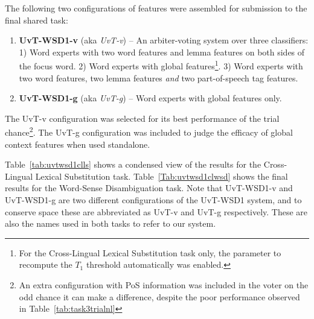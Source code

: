 
The following two configurations of features were assembled for submission to
the final shared task:

\begin{enumerate}
\item \textbf{UvT-WSD1-v} (aka \emph{UvT-v}) -- An arbiter-voting system over
three classifiers: 1) Word experts with two word features and lemma features on
both sides of the focus word. 2) Word experts with global features\footnote{For
the Cross-Lingual Lexical Substitution task only, the parameter to recompute
the $T_1$ threshold automatically was enabled.}. 3) Word experts with two word
features, two lemma features \emph{and} two part-of-speech tag features.  
\item \textbf{UvT-WSD1-g} (aka \emph{UvT-g}) -- Word experts with global features
only.
\end{enumerate}

The UvT-v configuration was selected for its best performance of the trial
chance\footnote{An extra configuration with PoS information was included in the
voter on the odd chance it can make a difference, despite the poor performance
observed in Table~\ref{tab:task3trialnl}}. The UvT-g configuration was included
to judge the efficacy of global context features when used standalone.

Table~\ref{tab:uvtwsd1clls} shows a condensed view of the results for the Cross-Lingual Lexical
Substitution task. Table~\ref{Tab:uvtwsd1clwsd} shows the final results for the Word-Sense
Disambiguation task. Note that UvT-WSD1-v and UvT-WSD1-g are two different
configurations of the UvT-WSD1 system, and to conserve space these are
abbreviated as UvT-v and UvT-g respectively. These are also the names used in
both tasks \citep{WSD,CLLS} to refer to our system.

